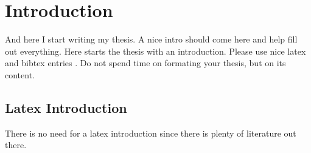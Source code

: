\chapter{Introduction}
\label{chapter:Introduction}

And here I start writing my thesis. A nice intro should come here and help
fill out everything.
Here starts the thesis with an introduction. Please use nice latex and bibtex entries \cite{latex}. Do not spend time on formating your thesis, but on its content. 
 
\section{Latex Introduction}
There is no need for a latex introduction since there is plenty of literature out there.
 



